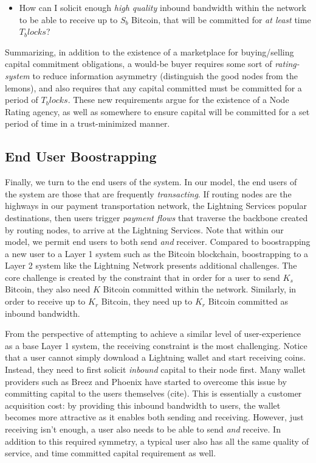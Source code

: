 \documentclass[12pt,a4paper]{article}
\theoremstyle{definition}
\begin{document}
\begin{itemize}
        \item How can I solicit enough \emph{high quality} inbound bandwidth
            within the network to be able to receive up to $S_b$ Bitcoin, that
            will be committed for \emph{at least} time $T_blocks$?
\end{itemize}

Summarizing, in addition to the existence of a marketplace for buying/selling
capital commitment obligations, a would-be buyer requires some sort of
\emph{rating-system} to reduce information asymmetry (distinguish the good
nodes from the lemons), and also requires that any capital committed must be
committed for a period of $T_blocks$. These new requirements argue for the
existence of a Node Rating agency, as well as somewhere to ensure capital will
be committed for a set period of time in a trust-minimized manner.


\subsection{End User Boostrapping}

Finally, we turn to the end users of the system. In our model, the end users of
the system are those that are frequently \emph{transacting}. If routing nodes
are the highways in our payment transportation network, the Lightning
Services popular destinations, then users trigger \emph{payment flows} that
traverse the backbone created by routing nodes, to arrive at the Lightning
Services. Note that within our model, we permit end users to both send
\emph{and} receiver. Compared to boostrapping a new user to a Layer 1 system
such as the Bitcoin blockchain, boostrapping to a Layer 2 system like the
Lightning Network presents additional challenges. The core challenge is created
by the constraint that in order for a user to send $K_s$ Bitcoin, they also
need $K$ Bitcoin committed within the network. Similarly, in order to receive
up to $K_r$ Bitcoin, they need up to $K_r$ Bitcoin committed as inbound
bandwidth.

From the perspective of attempting to achieve a similar level of
user-experience as a base Layer 1 system, the receiving constraint is the most
challenging. Notice that a user cannot simply download a Lightning wallet and
start receiving coins. Instead, they need to first solicit \emph{inbound}
capital to their node first. Many wallet providers such as Breez and Phoenix
have started to overcome this issue by committing capital to the users
themselves (cite). This is essentially a customer acquisition cost: by
providing this inbound bandwidth to users, the wallet becomes more attractive
as it enables both sending and receiving. However, just receiving isn't enough,
a user also needs to be able to send \emph{and} receive. In addition to this
required symmetry, a typical user also has all the same quality of service, and
time committed capital requirement as well.
\end{document}
